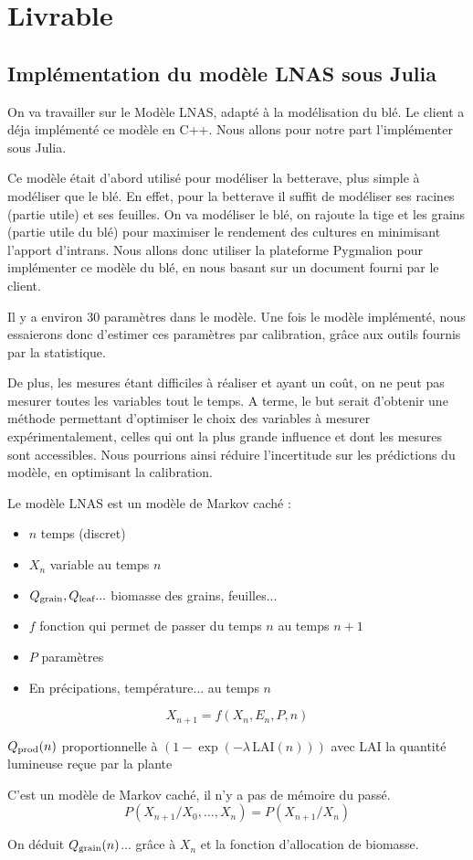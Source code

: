 \section{Livrable}
\subsection{Implémentation du modèle LNAS sous Julia}
On va travailler sur le Modèle LNAS, adapté à la modélisation du blé. 
Le client a déja implémenté ce modèle en C++. 
Nous allons pour notre part l'implémenter sous Julia.

Ce modèle était d'abord utilisé pour modéliser la betterave, 
plus simple à modéliser que le blé. 
En effet, pour la betterave il suffit de modéliser 
ses racines (partie utile) et ses feuilles.
On va modéliser le blé, on rajoute la tige et les grains (partie utile du blé)
pour maximiser le rendement des cultures en minimisant l’apport d’intrans.
Nous allons donc utiliser la plateforme Pygmalion pour implémenter ce modèle du blé,
en nous basant sur un document fourni par le client.

Il y a environ 30 paramètres dans le modèle. Une fois le modèle implémenté, nous essaierons donc d'estimer ces paramètres par calibration, grâce aux outils fournis par la statistique.

De plus, les mesures étant difficiles à réaliser et ayant un coût, on ne peut pas mesurer toutes les variables tout le temps. A terme, le but serait \"d'obtenir une méthode permettant d'optimiser le choix des variables à mesurer expérimentalement\”, celles qui ont la plus grande influence et dont les mesures sont accessibles. Nous pourrions ainsi réduire l'incertitude sur les prédictions du modèle, en optimisant la calibration.


Le modèle LNAS est un modèle de Markov caché : 
\begin{itemize}
  \item $n$  temps (discret)     
  \item $X_n$ variable au temps $n$       
  \item $Q_{\text{grain}}, Q_{\text{leaf}}... $ biomasse des grains, feuilles...      
  \item $f$ fonction qui permet de passer du temps $n$ au temps $n+1$     
  \item $P$ paramètres      
  \item En précipations, température... au temps $n$
\end{itemize}

\begin{equation}
  X_{n+1} = f(X_n,E_n,P,n)
\end{equation} 

$Q_{\text{prod}}(n)$ proportionnelle à $(1-\exp{(-\lambda \, \text{LAI}(n))})$ 
avec LAI la quantité lumineuse reçue par la plante

C’est un modèle de Markov caché, il n'y a pas de mémoire du passé.
\[
  P(X_{n+1}/X_0,…,X_n) = P(X_{n+1} / X_n) 
\] 

On déduit $Q_{\text{grain}}(n)$... grâce à $X_n$ et la fonction d'allocation de biomasse.
